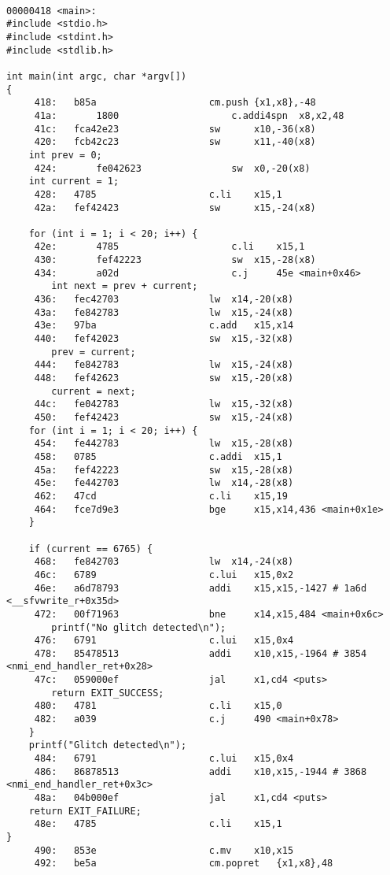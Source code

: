 \begin{lstlisting}[caption={Assembly code for coverage test program}, label=lst:asm_coverage, language=riscv]

00000418 <main>:
#include <stdio.h>
#include <stdint.h>
#include <stdlib.h>

int main(int argc, char *argv[])
{
     418:	b85a                    cm.push {x1,x8},-48
     41a:       1800                    c.addi4spn	x8,x2,48
     41c:	fca42e23                sw      x10,-36(x8)
     420:	fcb42c23                sw      x11,-40(x8)
    int prev = 0;
     424:       fe042623                sw	x0,-20(x8)
    int current = 1;
     428:	4785                    c.li    x15,1
     42a:	fef42423                sw      x15,-24(x8)

    for (int i = 1; i < 20; i++) {
     42e:       4785                    c.li    x15,1
     430:       fef42223                sw	x15,-28(x8)
     434:       a02d                    c.j     45e <main+0x46>
        int next = prev + current;
     436:	fec42703                lw	x14,-20(x8)
     43a:	fe842783                lw	x15,-24(x8)
     43e:	97ba                    c.add   x15,x14
     440:	fef42023                sw	x15,-32(x8)
        prev = current;
     444:	fe842783                lw	x15,-24(x8)
     448:	fef42623                sw	x15,-20(x8)
        current = next;
     44c:	fe042783                lw	x15,-32(x8)
     450:	fef42423                sw	x15,-24(x8)
    for (int i = 1; i < 20; i++) {
     454:	fe442783                lw	x15,-28(x8)
     458:	0785                    c.addi  x15,1
     45a:	fef42223                sw	x15,-28(x8)
     45e:	fe442703                lw	x14,-28(x8)
     462:	47cd                    c.li    x15,19
     464:	fce7d9e3                bge     x15,x14,436 <main+0x1e>
    }

    if (current == 6765) {
     468:	fe842703                lw	x14,-24(x8)
     46c:	6789                    c.lui   x15,0x2
     46e:	a6d78793                addi    x15,x15,-1427 # 1a6d <__sfvwrite_r+0x35d>
     472:	00f71963                bne     x14,x15,484 <main+0x6c>
        printf("No glitch detected\n");
     476:	6791                    c.lui   x15,0x4
     478:	85478513                addi    x10,x15,-1964 # 3854 <nmi_end_handler_ret+0x28>
     47c:	059000ef                jal     x1,cd4 <puts>
        return EXIT_SUCCESS;
     480:	4781                    c.li    x15,0
     482:	a039                    c.j     490 <main+0x78>
    }
    printf("Glitch detected\n");
     484:	6791                    c.lui   x15,0x4
     486:	86878513                addi    x10,x15,-1944 # 3868 <nmi_end_handler_ret+0x3c>
     48a:	04b000ef                jal     x1,cd4 <puts>
    return EXIT_FAILURE;
     48e:	4785                    c.li    x15,1
}
     490:	853e                    c.mv    x10,x15
     492:	be5a                    cm.popret	{x1,x8},48
\end{lstlisting}
